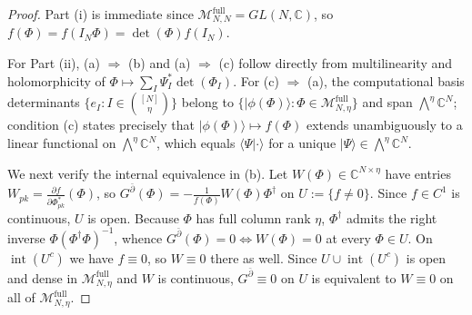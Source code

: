 \documentclass[11pt,a4paper]{article}
\theoremstyle{definition}
\newcommand{\C}{\mathbb{C}}
\newcommand{\ket}[1]{\lvert #1 \rangle}
\newcommand{\braket}[2]{\langle #1 \vert #2 \rangle}
\begin{document}
\begin{proof}
Part (i) is immediate since $\mathcal{M}_{N,N}^{\mathrm{full}} = GL(N,\C)$, so $f(\Phi) = f(I_N \Phi) = \det(\Phi) f(I_N)$.

For Part (ii), (a) $\Rightarrow$ (b) and (a) $\Rightarrow$ (c) follow directly from multilinearity and holomorphicity of $\Phi \mapsto \sum_I \Psi_I^* \det(\Phi_I)$. For (c) $\Rightarrow$ (a), the computational basis determinants $\{e_I : I \in \binom{[N]}{\eta}\}$ belong to $\{\ket{\phi(\Phi)} : \Phi \in \mathcal{M}_{N,\eta}^{\mathrm{full}}\}$ and span $\bigwedge^\eta \C^N$; condition (c) states precisely that $\ket{\phi(\Phi)} \mapsto f(\Phi)$ extends unambiguously to a linear functional on $\bigwedge^\eta \C^N$, which equals $\braket{\Psi}{\cdot}$ for a unique $\ket{\Psi} \in \bigwedge^\eta \C^N$.

We next verify the internal equivalence in (b). Let $W(\Phi) \in \C^{N\times \eta}$ have entries $W_{pk} = \frac{\partial f}{\partial \Phi^*_{pk}}(\Phi)$, so $G^{\bar{\partial}}(\Phi) = -\frac{1}{f(\Phi)} W(\Phi)\Phi^\dagger$ on $U := \{f \neq 0\}$. Since $f \in C^1$ is continuous, $U$ is open. Because $\Phi$ has full column rank $\eta$, $\Phi^\dagger$ admits the right inverse $\Phi(\Phi^\dagger \Phi)^{-1}$, whence $G^{\bar{\partial}}(\Phi) = 0 \iff W(\Phi) = 0$ at every $\Phi \in U$. On $\operatorname{int}(U^c)$ we have $f \equiv 0$, so $W \equiv 0$ there as well. Since $U \cup \operatorname{int}(U^c)$ is open and dense in $\mathcal{M}_{N,\eta}^{\mathrm{full}}$ and $W$ is continuous, $G^{\bar{\partial}} \equiv 0$ on $U$ is equivalent to $W \equiv 0$ on all of $\mathcal{M}_{N,\eta}^{\mathrm{full}}$.


\end{proof}
\end{document}
